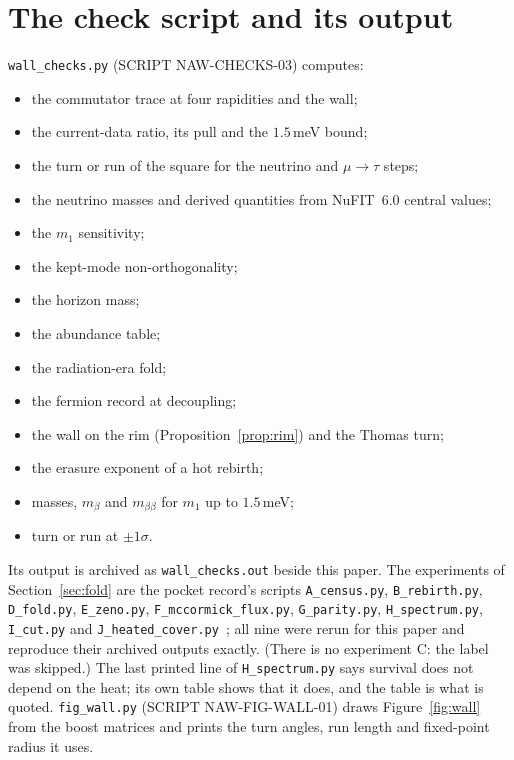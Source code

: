 \documentclass[11pt]{article}
\theoremstyle{definition}\newtheorem{hypothesis}{Hypothesis}\newtheorem{prediction}{Prediction}
\theoremstyle{remark}\newtheorem{remark}[theorem]{Remark}
\begin{document}
\section{The check script and its output}
\noindent\texttt{wall\_checks.py} (SCRIPT NAW-CHECKS-03) computes:
\begin{itemize}[nosep]
\item the commutator trace at four rapidities and the wall;
\item the current-data ratio, its pull and the $1.5$\,meV bound;
\item the turn or run of the square for the neutrino and $\mu\to\tau$ steps;
\item the neutrino masses and derived quantities from NuFIT~6.0 central values;
\item the $m_1$ sensitivity;
\item the kept-mode non-orthogonality;
\item the horizon mass;
\item the abundance table;
\item the radiation-era fold;
\item the fermion record at decoupling;
\item the wall on the rim (Proposition~\ref{prop:rim}) and the Thomas turn;
\item the erasure exponent of a hot rebirth;
\item masses, $m_\beta$ and $m_{\beta\beta}$ for $m_1$ up to $1.5$\,meV;
\item turn or run at $\pm1\sigma$.
\end{itemize}
Its output is archived as \texttt{wall\_checks.out} beside this paper. The experiments of Section~\ref{sec:fold} are the pocket record's scripts \texttt{A\_census.py}, \texttt{B\_rebirth.py}, \texttt{D\_fold.py}, \texttt{E\_zeno.py}, \texttt{F\_mccormick\_flux.py}, \texttt{G\_parity.py}, \texttt{H\_spectrum.py}, \texttt{I\_cut.py} and \texttt{J\_heated\_cover.py}~\cite{Pocket}; all nine were rerun for this paper and reproduce their archived outputs exactly. (There is no experiment C: the label was skipped.) The last printed line of \texttt{H\_spectrum.py} says survival does not depend on the heat; its own table shows that it does, and the table is what is quoted. \texttt{fig\_wall.py} (SCRIPT NAW-FIG-WALL-01) draws Figure~\ref{fig:wall} from the boost matrices and prints the turn angles, run length and fixed-point radius it uses.
\end{document}
